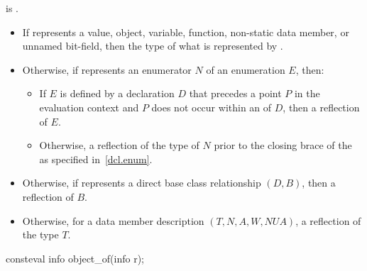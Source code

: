 \begin{itemdescr}
\pnum
\constantwhen
{} is .

\pnum
\returns
\begin{itemize}
\item
  If  represents a
  value,
  object,
  variable,
  function,
  non-static data member, or
  unnamed bit-field,
  then the type of what is represented by .
\item
  Otherwise, if  represents
  an enumerator $N$ of an enumeration $E$, then:
  \begin{itemize}
  \item
    If $E$ is defined by a declaration $D$
    that precedes a point $P$ in the evaluation context
    and $P$ does not occur within an  of $D$,
    then a reflection of $E$.
  \item
    Otherwise, a reflection of the type of $N$
    prior to the closing brace of the 
    as specified in~\ref{dcl.enum}.
  \end{itemize}
\item
  Otherwise, if  represents
  a direct base class relationship $(D, B)$,
  then a reflection of $B$.
\item
  Otherwise, for a data member description $(T, N, A, W, \mathit{NUA})$,
  a reflection of the type $T$.
\end{itemize}
\end{itemdescr}

%
\begin{itemdecl}
consteval info object_of(info r);
\end{itemdecl}

